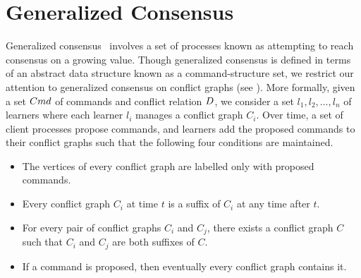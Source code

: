 \section{Generalized Consensus}
Generalized consensus~\cite{lamport1998part, sutra2011fast} involves a set of
processes known as  attempting to reach consensus on a
growing value. Though generalized consensus is defined in terms of an abstract
data structure known as a command-structure set, we restrict our attention to
generalized consensus on conflict graphs (see ). More
formally, given a set $Cmd$ of commands and conflict relation $D$, we
consider a set $l_1, l_2, \ldots, l_n$ of learners where each learner $l_i$
manages a conflict graph $C_i$. Over time, a set of client processes propose
commands, and learners add the proposed commands to their conflict graphs such
that the following four conditions are maintained.
\begin{itemize}
  \item {}
    The vertices of every conflict graph are labelled only with proposed
    commands.
  \item {}
    Every conflict graph $C_i$ at time $t$ is a suffix of $C_i$ at any time after
    $t$.
  \item {}
    For every pair of conflict graphs $C_i$ and $C_j$, there exists a conflict
    graph $C$ such that $C_i$ and $C_j$ are both suffixes of $C$.
  \item {}
    If a command is proposed, then eventually every conflict graph contains it.
\end{itemize}

